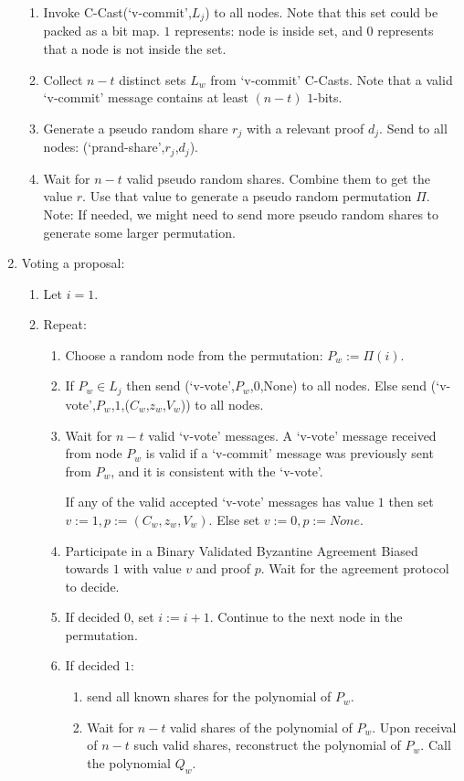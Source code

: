 \begin{enumerate}
\begin{enumerate}
    \item Invoke C-Cast(`v-commit',$L_j$) to all nodes. Note that this set could
      be packed as a bit map. $1$ represents: node is inside set, and $0$
      represents that a node is not inside the set.
    \item Collect $n-t$ distinct sets $L_w$ from `v-commit' C-Casts. Note that a
      valid `v-commit' message contains at least $(n-t)$ $1$-bits.
    \item Generate a pseudo random share $r_j$ with a relevant proof $d_j$. Send
      to all nodes: (`prand-share',$r_j$,$d_j$).
    \item Wait for $n-t$ valid pseudo random shares. Combine them to get the
      value $r$. Use that value to generate a pseudo random permutation $\Pi$.
      Note: If needed, we might need to send more pseudo random shares to
      generate some larger permutation.
  \end{enumerate}
  \item Voting a proposal:
  \begin{enumerate}
    \item Let $i = 1$.
    \item Repeat:
      \begin{enumerate}
        \item Choose a random node from the permutation: $P_w := {\Pi}(i)$.
        \item If $P_w \in L_j$ then send (`v-vote',$P_w$,$0$,None) to all nodes.
          Else send (`v-vote',$P_w$,$1$,($C_w$,$z_w$,$V_w$)) to all nodes.
        \item Wait for $n-t$ valid `v-vote' messages. A `v-vote' message
          received from node $P_w$ is valid if a `v-commit' message was
          previously sent from $P_w$, and it is consistent with the `v-vote'.
          
          If any of the valid accepted `v-vote' messages has value $1$ then set
          $v := 1, p:= (C_w,z_w,V_w)$. Else set $v := 0, p:= None$.

        \item Participate in a Binary Validated Byzantine Agreement Biased
          towards $1$ with value $v$ and proof $p$. Wait for the agreement
          protocol to decide.
        \item If decided $0$, set $i := i + 1$. Continue to the next node in the
          permutation.
        \item If decided $1$:
        \begin{enumerate}
          \item send all known shares for the polynomial of $P_w$.
          \item Wait for $n-t$ valid shares of the polynomial of $P_w$. Upon
            receival of $n-t$ such valid shares, reconstruct the polynomial of
            $P_w$. Call the polynomial $Q_w$.


\end{enumerate}
\end{enumerate}
\end{enumerate}
\end{enumerate}
